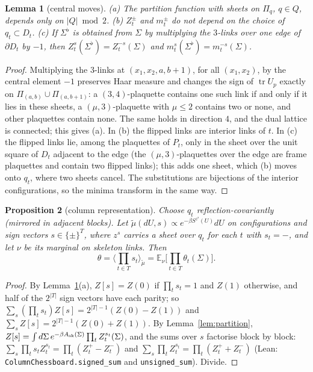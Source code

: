 \documentclass[11pt,a4paper]{article}
\newtheorem{lemma}{Lemma}[section]
\newtheorem{proposition}[lemma]{Proposition}
\theoremstyle{definition}
\theoremstyle{remark}
\newcommand{\E}{\mathbb{E}}
\newcommand{\tr}{\operatorname{tr}}
\newcommand{\code}[1]{\texttt{#1}}
\begin{document}
\begin{lemma}[central moves]\label{lem:moves}
(a) The partition function with sheets on $\Pi_q$, $q\in Q$, depends only on $|Q|\bmod2$.
(b) $Z^\pm_t$ and $m^\pm_t$ do not depend on the choice of $q_t\subset D_t$.
(c) If $\Sigma^\flat$ is obtained from $\Sigma$ by multiplying the $3$-links over one edge of $\partial D_t$ by $-1$, then $Z^s_t(\Sigma^\flat)=Z^{-s}_t(\Sigma)$ and $m^s_t(\Sigma^\flat)=m^{-s}_t(\Sigma)$.
\end{lemma}
\begin{proof}
Multiplying the $3$-links at $(x_1,x_2,a,b+1)$, for all $(x_1,x_2)$, by the central element $-1$ preserves Haar measure and changes the sign of $\tr U_p$ exactly on $\Pi_{(a,b)}\cup\Pi_{(a,b+1)}$: a $(3,4)$-plaquette contains one such link if and only if it lies in these sheets, a $(\mu,3)$-plaquette with $\mu\le2$ contains two or none, and other plaquettes contain none.
The same holds in direction $4$, and the dual lattice is connected; this gives (a).
In (b) the flipped links are interior links of $t$.
In (c) the flipped links lie, among the plaquettes of $P_t$, only in the sheet over the unit square of $D_t$ adjacent to the edge (the $(\mu,3)$-plaquettes over the edge are frame plaquettes and contain two flipped links); this adds one sheet, which (b) moves onto $q_t$, where two sheets cancel.
The substitutions are bijections of the interior configurations, so the minima transform in the same way.
\end{proof}

\begin{proposition}[column representation]\label{prop:column}
Choose $q_t$ reflection-covariantly (mirrored in adjacent blocks). Let $\tilde\mu(dU,s)\propto e^{-\beta S^{z^s}(U)}dU$ on configurations and sign vectors $s\in\{\pm\}^T$, where $z^s$ carries a sheet over $q_t$ for each $t$ with $s_t=-$, and let $\nu$ be its marginal on skeleton links. Then
\[ \theta=\Big\langle\prod_{t\in T}s_t\Big\rangle_{\tilde\mu}=\E_\nu\Big[\prod_{t\in T}\theta_t(\Sigma)\Big]. \]
\end{proposition}
\begin{proof}
By Lemma~\ref{lem:moves}(a), $Z[s]=Z(0)$ if $\prod_ts_t=1$ and $Z(1)$ otherwise, and half of the $2^{|T|}$ sign vectors have each parity; so $\sum_s(\prod_t s_t)Z[s]=2^{|T|-1}(Z(0)-Z(1))$ and $\sum_sZ[s]=2^{|T|-1}(Z(0)+Z(1))$.
By Lemma~\ref{lem:partition}, $Z[s]=\int d\Sigma\,e^{-\beta A_{\rm sk}(\Sigma)}\prod_tZ_t^{s_t}(\Sigma)$, and the sums over $s$ factorise block by block: $\sum_s\prod_ts_tZ^{s_t}_t=\prod_t(Z^+_t-Z^-_t)$ and $\sum_s\prod_tZ^{s_t}_t=\prod_t(Z^+_t+Z^-_t)$ (Lean: \code{ColumnChessboard.signed\_sum} and \code{unsigned\_sum}). Divide.
\end{proof}
\end{document}
